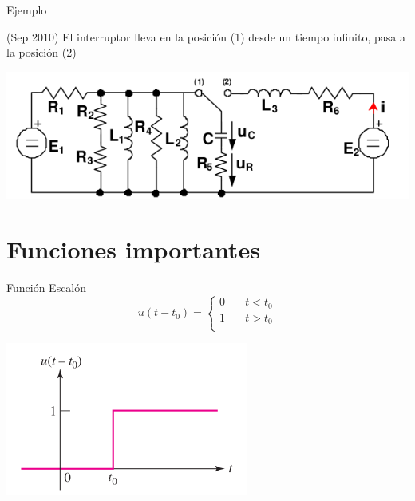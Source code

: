 \documentclass[xcolor={usenames,svgnames,dvipsnames}]{beamer}
\begin{document}
\begin{frame}[label={sec:org1755650}]{Ejemplo}
\begin{block}{(Sep 2010) El interruptor lleva en la posición (1) desde un tiempo infinito, pasa a la posición (2)}
\begin{center}
\includegraphics[width=.9\linewidth]{figs/ejemplo_condiciones_iniciales.pdf}
\end{center}
\end{block}
\end{frame}

\section{Funciones importantes}
\label{sec:orgda71b82}
\begin{frame}[label={sec:orgcbc688f}]{Función Escalón}
\[   
u(t - t_0) = 
     \begin{cases}
       0 &\quad t < t_0\\
       1 &\quad t > t_0\\
     \end{cases}
\]
\begin{center}
\includegraphics[width=.9\linewidth]{figs/funcion_escalon.pdf}
\end{center}
\end{frame}
\end{document}
